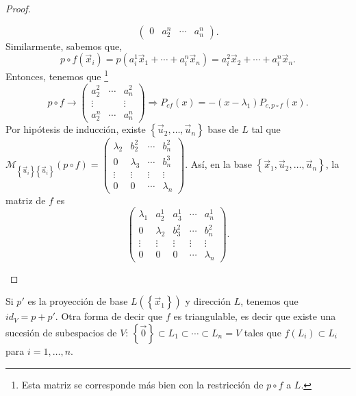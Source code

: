\begin{proof}
\begin{description}
\[\begin{pmatrix}
0 & a^{n}_{2} & \cdots & a^{n}_{n}\end{pmatrix} .\]
Similarmente, sabemos que, 
\[p\circ f\left(\vec{x}_{i}\right) = p\left(a^{1}_{i}\vec{x}_{1} + \cdots + a^{n}_{i}\vec{x}_{n}\right)= a^{2}_{i}\vec{x}_{2} + \cdots + a^{n}_{i}\vec{x}_{n} .\]
Entonces, tenemos que \footnote{Esta matriz se corresponde más bien con la restricción de $\displaystyle p\circ f $ a $\displaystyle L $.} 
\[p\circ f \to \begin{pmatrix} a^{2}_{2} & \cdots & a^{2}_{n} \\
\vdots & & \vdots \\
a^{n}_{2} & \cdots & a^{n}_{n}\end{pmatrix} \Rightarrow P_{cf}\left(x\right) = - \left(x - \lambda_{1}\right) P_{c,p \circ f}\left(x\right) .\]
	Por hipótesis de inducción, existe $\displaystyle \left\{ \vec{u}_{2}, \ldots, \vec{u}_{n}\right\}  $ base de $\displaystyle L $ tal que $\displaystyle \mathcal{M}_{ \left\{ \vec{u}_{i}\right\} \left\{ \vec{u}_{i}\right\} }\left(p \circ f\right) = \begin{pmatrix} \lambda_{2} & b^{2}_{2} & \cdots & b^{2}_{n} \\
	0 & \lambda_{3} & \cdots & b^{3}_{n} \\
\vdots & \vdots & \vdots & \vdots \\
0 & 0 & \cdots & \lambda_{n}\end{pmatrix} $. Así, en la base $\displaystyle \left\{ \vec{x}_{1}, \vec{u}_{2}, \ldots, \vec{u}_{n}\right\}  $, la matriz de $\displaystyle f $ es
		\[\begin{pmatrix} \lambda_{1} & a^{1}_{2} & a^{1}_{3} & \cdots & a^{1}_{n}\\
		0 & \lambda_{2} & b^{2}_{3} & \cdots & b^{2}_{n} \\
	\vdots & \vdots & \vdots & \vdots & \vdots \\
0 & 0 & 0 & \cdots & \lambda_{n}\end{pmatrix} .\]
\end{description}
\end{proof}
\begin{observation}
\normalfont 
Si $\displaystyle p' $ es la proyección de base $\displaystyle L\left( \left\{ \vec{x}_{1}\right\} \right) $ y dirección $\displaystyle L $, tenemos que $\displaystyle id _{V} = p + p' $. Otra forma de decir que $\displaystyle f $ es triangulable, es decir que existe una sucesión de subespacios de $\displaystyle V $: $\displaystyle \left\{ \vec{0}\right\}  \subset L_{1} \subset \cdots \subset L_{n} = V $ tales que $\displaystyle f\left(L_{i}\right) \subset L_{i} $ para $\displaystyle i = 1, \ldots, n $.
\end{observation}

